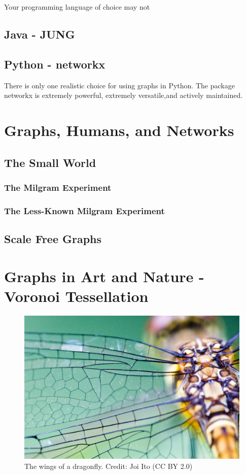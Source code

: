 Your programming language of choice may not 

\subsection{Java - JUNG}

\subsection{Python - networkx}

There is only one realistic choice for using graphs in Python.  The package networkx is extremely powerful, extremely versatile,and actively maintained.




\section{Graphs, Humans, and Networks}

\subsection{The Small World}
\subsubsection{The Milgram Experiment}
\subsubsection{The Less-Known Milgram Experiment}

\subsection{Scale Free Graphs}


\section{Graphs in Art and Nature - Voronoi Tessellation}

\begin{figure}
	\centering
	\includegraphics[width=0.7\linewidth]{pics/dragonfly_wing_joi_ito}
	\caption{The wings of a dragonfly. Credit: Joi Ito (CC BY 2.0)}
	\label{fig:dragonflywingjoiito}
\end{figure}


